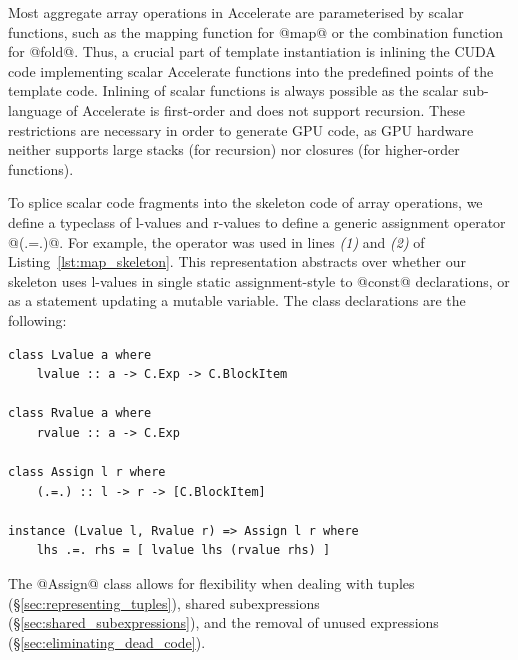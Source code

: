 Most aggregate array operations in Accelerate are parameterised by scalar
functions, such as the mapping function for @map@ or the combination
function for @fold@. Thus, a crucial part of template instantiation is
inlining the CUDA code implementing scalar Accelerate functions into the
predefined points of the template code. Inlining of scalar functions is always
possible as the scalar sub-language of Accelerate is first-order and does not
support recursion. These restrictions are necessary in order to generate GPU
code, as GPU hardware neither supports large stacks (for recursion) nor closures
(for higher-order functions).

To splice scalar code fragments into the skeleton code of array operations, we
define a typeclass of l-values and r-values to define a generic assignment
operator @(.=.)@. For example, the operator was used in lines \emph{(1)}
and \emph{(2)} of Listing~\ref{lst:map_skeleton}. This representation abstracts
over whether our skeleton uses l-values in single static assignment-style to
@const@ declarations, or as a statement updating a mutable variable. The
class declarations are the following:
%
\begin{lstlisting}[style=haskell]
class Lvalue a where
    lvalue :: a -> C.Exp -> C.BlockItem

class Rvalue a where
    rvalue :: a -> C.Exp

class Assign l r where
    (.=.) :: l -> r -> [C.BlockItem]

instance (Lvalue l, Rvalue r) => Assign l r where
    lhs .=. rhs = [ lvalue lhs (rvalue rhs) ]
\end{lstlisting}

The @Assign@ class allows for flexibility when dealing with tuples
(\S\ref{sec:representing_tuples}), shared subexpressions
(\S\ref{sec:shared_subexpressions}), and the removal of unused expressions
(\S\ref{sec:eliminating_dead_code}).


\skeleton[|)]{}


